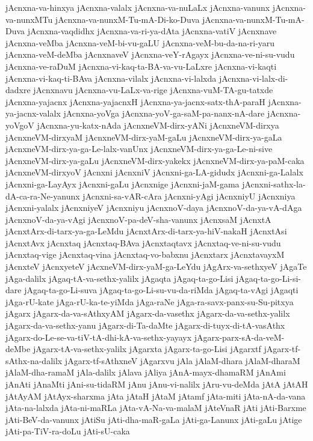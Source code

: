 {jAcnxna-va-hinxya
jAcnxna-valalx
jAcnxna-va-nuLaLx
jAcnxna-vanunx
jAcnxna-va-nunxMTu
jAcnxna-va-nunxM-Tu-mA-Di-ko-Duva
jAcnxna-va-nunxM-Tu-mA-Duva
jAcnxna-vaqdidhx
jAcnxna-va-ri-ya-dAta
jAcnxna-vatiV
jAcnxnave
jAcnxna-veMba
jAcnxna-veM-bi-vu-gaLU
jAcnxna-veM-bu-da-na-ri-yaru
jAcnxna-veM-deMba
jAcnxnaveV
jAcnxna-veY-rAgayx
jAcnxna-ve-ni-su-vudu
jAcnxna-ve-raDuM
jAcnxna-vi-kaq-ta-BA-va-vu-LaLxre
jAcnxna-vi-kaqti
jAcnxna-vi-kaq-ti-BAva
jAcnxna-vilalx
jAcnxna-vi-lalxda
jAcnxna-vi-lalx-di-dadxre
jAcnxnavu
jAcnxna-vu-LaLx-va-rige
jAcnxna-vuM-TA-gu-tatxde
jAcnxna-yajacnx
jAcnxna-yajacnxH
jAcnxna-ya-jacnx-satx-thA-paraH
jAcnxna-ya-jacnx-valalx
jAcnxna-yoVga
jAcnxna-yoV-ga-saM-pa-nanx-nA-dare
jAcnxna-yoVgoV
jAcnxna-yu-katx-nAda
jAcnxneVM-dirx-yANi
jAcnxneVM-dirxya
jAcnxneVM-dirxyaM
jAcnxneVM-dirx-yaM-gaLu
jAcnxneVM-dirx-ya-gaLa
jAcnxneVM-dirx-ya-ga-Le-lalx-vanUnx
jAcnxneVM-dirx-ya-ga-Le-ni-sive
jAcnxneVM-dirx-ya-gaLu
jAcnxneVM-dirx-yakekx
jAcnxneVM-dirx-ya-paM-caka
jAcnxneVM-dirxyoV
jAcnxni
jAcnxniV
jAcnxni-ga-LA-gidudx
jAcnxni-ga-Lalalx
jAcnxni-ga-LayAyx
jAcnxni-gaLu
jAcnxnige
jAcnxni-jaM-gama
jAcnxni-sathx-la-dA-ca-ra-Ne-yanunx
jAcnxni-sa-vAR-cAra
jAcnxni-yAgi
jAcnxniyU
jAcnxniya
jAcnxni-yalalx
jAcnxniyeV
jAcnxniyu
jAcnxnoV-daya
jAcnxnoV-da-ya-vA-dAga
jAcnxnoV-da-ya-vAgi
jAcnxnoV-pa-deV-sha-vanunx
jAcnxsaM
jAcnxtA
jAcnxtArx-di-tarx-ya-ga-LeMdu
jAcnxtArx-di-tarx-ya-hiV-nakaH
jAcnxtAsi
jAcnxtAvx
jAcnxtaq
jAcnxtaq-BAva
jAcnxtaqtavx
jAcnxtaq-ve-ni-su-vudu
jAcnxtaq-vige
jAcnxtaq-vina
jAcnxtaq-vo-babxnu
jAcnxtarx
jAcnxtavayxM
jAcnxteV
jAcnxyeteV
jAcxneVM-dirx-yaM-ga-LeYdu
jAgArx-va-sethxyeV
jAgaTe
jAga-dalilx
jAgaq-tA-va-sethx-yalilx
jAgaqta
jAgaq-ta-go-Lisi
jAgaq-ta-go-Li-si-dare
jAgaq-ta-go-Li-suva
jAgaq-ta-go-Li-su-vu-da-riMda
jAgaq-ta-vAgi
jAgaqti
jAga-rU-kate
jAga-rU-ka-te-yiMda
jAga-raNe
jAga-ra-savx-panx-su-Su-pitxya
jAgarx
jAgarx-da-va-sAthxyAM
jAgarx-da-vasethx
jAgarx-da-va-sethx-yalilx
jAgarx-da-va-sethx-yanu
jAgarx-di-Ta-daMte
jAgarx-di-tuyx-di-tA-vasAthx
jAgarx-do-Le-se-va-tiV-tA-dhi-kA-va-sethx-yayayx
jAgarx-parx-sA-da-veM-deMbe
jAgarx-tA-va-sethx-yalilx
jAgarxta
jAgarx-ta-go-Lisi
jAgarxtf
jAgarx-tf-sAthx-na-dalilx
jAgarx-tf-sAthxneV
jAgarxvu
jAla
jAlaM-dhara
jAlaM-dharaM
jAlaM-dha-ramaM
jAla-dalilx
jAlava
jAliya
jAnA-mayx-dhamaRM
jAnAmi
jAnAti
jAnaMti
jAni-su-tidaRM
jAnu
jAnu-vi-nalilx
jAru-vu-deMda
jAtA
jAtAH
jAtAyAM
jAtAyx-sharxma
jAta
jAtaH
jAtaM
jAtamf
jAta-miti
jAta-nA-da-vana
jAta-na-lalxda
jAta-ni-maRLa
jAta-vA-Na-va-malaM
jAteVnaR
jAti
jAti-Barxme
jAti-BeV-da-vanunx
jAtiSu
jAti-dha-maR-gaLa
jAti-ga-Lanunx
jAti-gaLu
jAtige
jAti-pa-TiV-ra-doLu
jAti-sU-caka
}
